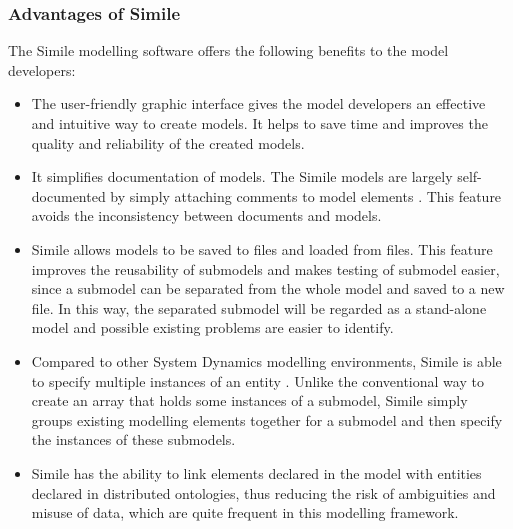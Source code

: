 \subsubsection{Advantages of Simile}
\par
The Simile modelling software offers the following benefits to the model developers:

\begin{itemize}
\item 
The user-friendly graphic interface gives the model developers an effective and intuitive way to create models. It helps to save time and improves the quality and reliability of the created models.
\item
It simplifies documentation of models. The Simile models are largely self-documented by simply attaching comments to model elements \autocite{dsl:simile-muetzelfeldt}. This feature avoids the inconsistency between documents and models. 
\item
Simile allows models to be saved to files and loaded from files. This feature improves the reusability of submodels and makes testing of submodel easier, since a submodel can be separated from the whole model and saved to a new file. In this way, the separated submodel will be regarded as a stand-alone model and possible existing problems are easier to identify.
\item
Compared to other System Dynamics modelling environments, Simile is able to specify multiple instances of an entity \autocite{dsl:simile-muetzelfeldt}. Unlike the conventional way to create an array that holds some instances of a submodel, Simile simply groups existing modelling elements together for a submodel and then specify the instances of these submodels.
\item 
Simile has the ability to link elements declared in the model with entities declared in distributed ontologies, thus reducing the risk of ambiguities and misuse of data, which are quite frequent in this modelling framework.
\end{itemize}


